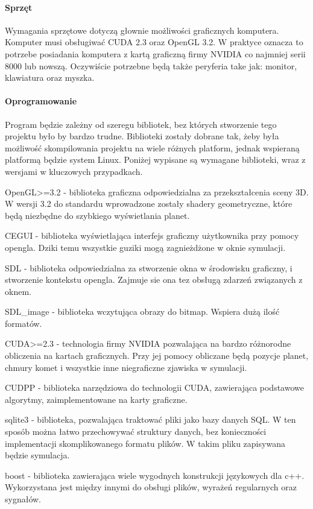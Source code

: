 \paragraph{Sprzęt}
Wymagania sprzętowe dotyczą głownie możliwości graficznych komputera. Komputer musi obsługiwać CUDA 2.3 oraz OpenGL 3.2. W praktyce oznacza to potrzebe posiadania komputera z kartą graficzną firmy NVIDIA co najmniej serii 8000 lub nowszą. Oczywiście potrzebne będą także peryferia take jak: monitor, klawiatura oraz myszka.

\paragraph{Oprogramowanie}
Program będzie zależny od szeregu bibliotek, bez których stworzenie tego projektu było by bardzo trudne. Biblioteki zostały dobrane tak, żeby była możliwość skompilowania projektu na wiele różnych platform, jednak wspieraną platformą będzie system Linux. Poniżej wypisane są wymagane biblioteki, wraz z wersjami w kluczowych przypadkach.
\begin{description}
\item{OpenGL>=3.2} - biblioteka graficzna odpowiedzialna za przekształcenia sceny 3D. W wersji 3.2 do standardu wprowadzone zostały shadery geometryczne, które będą niezbędne do szybkiego wyświetlania planet.
\item{CEGUI} - biblioteka wyświetlająca interfejs graficzny użytkownika przy pomocy opengla. Dziki temu wszystkie guziki mogą zagnieżdżone w oknie symulacji.
\item{SDL} - biblioteka odpowiedzialna za stworzenie okna w środowisku graficzny, i stworzenie kontekstu opengla. Zajmuje sie ona tez obsługą zdarzeń związanych z oknem.
\item{SDL\_image} - biblioteka wczytująca obrazy do bitmap. Wspiera dużą ilość formatów.
\item{CUDA>=2.3} - technologia firmy NVIDIA pozwalająca na bardzo różnorodne obliczenia na kartach graficznych. Przy jej pomocy obliczane będą pozycje planet, chmury komet i wszystkie inne niegraficzne zjawiska w symulacji.
\item{CUDPP} - biblioteka narzędziowa do technologii CUDA, zawierająca podstawowe algorytmy, zaimplementowane na karty graficzne.
\item{sqlite3} - biblioteka, pozwalająca traktować pliki jako bazy danych SQL. W ten sposób można łatwo przechowywać struktury danych, bez konieczności implementacji skomplikowanego formatu plików. W takim pliku zapisywana będzie symulacja.
\item{boost} - biblioteka zawierająca wiele wygodnych konstrukcji językowych dla c++. Wykorzystana jest między innymi do obsługi plików, wyrażeń regularnych oraz sygnałów.
\end{description}


